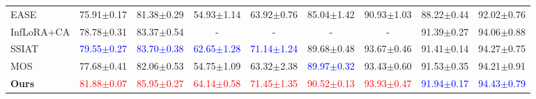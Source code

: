 \begin{table*}[!htb]
{\begin{tabular}{lcccccccc}
EASE\cite{zhou2024expandable} & 75.91$\pm$0.17  &    81.38$\pm$0.29 & 54.93$\pm$1.14  & 63.92$\pm$0.76   &   85.04$\pm$1.42 &  90.93$\pm$1.03 &  88.22$\pm$0.44 &  92.02$\pm$0.76 \\
InfLoRA+CA\cite{liang2024inflora} & 78.78$\pm$0.31 & 83.37$\pm$0.54 & -    & -   & -   & - & 91.39$\pm$0.27 & 94.06$\pm$0.88  \\
SSIAT\cite{tan2024semantically}  & \textcolor{blue}{79.55$\pm$0.27}  & \textcolor{blue}{83.70$\pm$0.38}   & \textcolor{blue}{62.65$\pm$1.28}    & \textcolor{blue}{71.14$\pm$1.24}   &   89.68$\pm$0.48  & 93.67$\pm$0.46  & 91.41$\pm$0.14    & 94.27$\pm$0.75 \\ 
MOS\cite{sun2024mos} & 77.68$\pm$0.41 & 82.06$\pm$0.53 & 54.75$\pm$1.09 & 63.32$\pm$2.38 & \textcolor{blue}{89.97$\pm$0.32} & 93.43$\pm$0.60 & 91.53$\pm$0.35 & 94.21$\pm$0.91 \\
\midrule
\textbf{Ours} & \textcolor{red}{81.88$\pm$0.07}  & \textcolor{red}{85.95$\pm$0.27}  & \textcolor{red}{64.14$\pm$0.58}  & \textcolor{red}{71.45$\pm$1.35}   & \textcolor{red}{90.52$\pm$0.13}    & \textcolor{red}{93.93$\pm$0.47} & \textcolor{blue}{91.94$\pm$0.17}    & \textcolor{blue}{94.43$\pm$0.79} \\ 
\bottomrule
\end{tabular}
}
\vspace{-3mm}
\end{table*}
